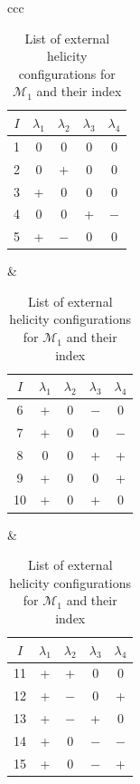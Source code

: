 \begin{table}[hbtp]
    \centering
    \caption{List of external helicity configurations for $\mathcal{M}_1$ and their index}
    \label{tab:lambdas}
    
    \begin{tabular}{ccc}
    
    \begin{tabular}{c|cccc}
    $I$ & $\lambda_1$ & $\lambda_2$ & $\lambda_3$ & $\lambda_4$ \\
    \hline
    1 & 0 & 0 & 0 & 0 \\
    2 & 0 & + & 0 & 0 \\
    3 & + & 0 & 0 & 0 \\
    4 & 0 & 0 & + &$-$ \\
    5 & + &$-$ & 0 & 0 \\
    \end{tabular}
    &
    \begin{tabular}{c|cccc}
    $I$ & $\lambda_1$ & $\lambda_2$ & $\lambda_3$ & $\lambda_4$ \\
    \hline
    6 & + & 0 & $-$& 0 \\
    7 & + & 0 & 0 & $-$\\
    8 & 0 & 0 & + & + \\
    9 & + & 0 & 0 & + \\
    10 & + & 0 & + & 0 \\
    \end{tabular}
    &
    \begin{tabular}{c|cccc}
    $I$ & $\lambda_1$ & $\lambda_2$ & $\lambda_3$ & $\lambda_4$ \\
    \hline
    11 & + & + & 0 & 0 \\
    12 & + & $-$& 0 & + \\
    13 & + & $-$ & + & 0 \\
    14 & + & 0 & $-$ & $-$ \\
    15 & + & 0 & $-$ & + \\
    \end{tabular}
    
    \\[2em]
    

\end{tabular}
\end{table}
